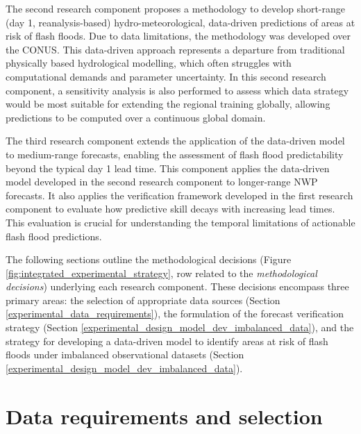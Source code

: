 The  second research component proposes a methodology to develop short-range (day 1, reanalysis-based) hydro-meteorological, data-driven predictions of areas at risk of flash floods. Due to data limitations, the methodology was developed over the CONUS. This data-driven approach represents a departure from traditional physically based hydrological modelling, which often struggles with computational demands and parameter uncertainty. In this second research component, a sensitivity analysis is also performed to assess which data strategy would be most suitable for extending the regional training globally, allowing predictions to be computed over a continuous global domain.

The  third research component extends the application of the data-driven model to medium-range forecasts, enabling the assessment of flash flood predictability beyond the typical day 1 lead time. This component applies the data-driven model developed in the second research component to longer-range NWP forecasts. It also applies the verification framework developed in the first research component to evaluate how predictive skill decays with increasing lead times. This evaluation is crucial for understanding the temporal limitations of actionable flash flood predictions.

The following sections outline the methodological decisions (Figure \ref{fig:integrated_experimental_strategy}, row related to the \textit{methodological decisions}) underlying each research component. These decisions encompass three primary areas: the selection of appropriate data sources (Section \ref{experimental_data_requirements}), the formulation of the forecast verification strategy (Section \ref{experimental_design_model_dev_imbalanced_data}), and the strategy for developing a data-driven model to identify areas at risk of flash floods under imbalanced observational datasets (Section \ref{experimental_design_model_dev_imbalanced_data}). 


\section{Data requirements and selection}
\label{integrated_experimental_strategy_data_requirements}

